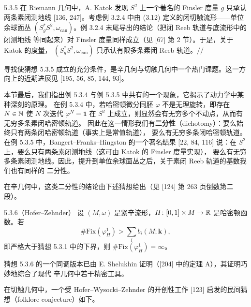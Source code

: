 \begin{wexam}{5.3.5}
  在 Riemann 几何中，A. Katok 发现 $S^2$ 上一个著名的 Finsler 度量 $g$ 只承认两条素闭测地线
  [136, 247]。考虑例 3.2.4 中由 (3.12) 定义的闭切触流形——单位余球面丛
  $(S_g^*S^2,\omega_{\mathrm{can}})$。例 3.2.4 末尾导出的结论（把闭 Reeb 轨道与底流形中的闭测地线
  等同起来）对 Finsler 度量同样成立（见 [67] 第 2 节）。于是，关于 Katok 的度量，
  $(S_g^*S^2,\omega_{\mathrm{can}})$ 只承认有限多条素闭 Reeb 轨道。\hfill$//$
\end{wexam}
寻找使猜想 5.3.5 成立的充分条件，是辛几何与切触几何中一个热门课题。这一方向上的近期进展见
[195, 56, 85, 144, 93]。

本节最后，我们指出例 5.3.4 与例 5.3.5 中共有的一个现象，它揭示了动力学中某种深刻的原理。
在例 5.3.4 中，若哈密顿微分同胚 $\varphi$ 不是无理旋转，即存在 $N\in\mathbb{N}$ 使 $N$ 次迭代
$\varphi^N=\mathbf{1}$ 在 $S^2$ 上成立，则显然会有无穷多个不动点，从而有无穷多条素闭哈密顿轨道。
因此在这一情形我们有\textbf{二分性}（dichotomy）：要么始终只有两条闭哈密顿轨道（事实上是常值轨道），
要么有无穷多条闭哈密顿轨道。在例 5.3.5 中，Bangert--Franks--Hingston 的一个著名结果
[22, 84, 116] 说：在 $S^2$ 上，要么只有两条素闭测地线（这可由 Katok 的 Finsler 度量实现），
要么有无穷多条素闭测地线。因此，提升到单位余球面丛之后，关于素闭 Reeb 轨道的基数我们也有同样的
二分性。

在辛几何中，这类二分性的结论由下述猜想给出（见 [124] 第 263 页倒数第二段）。

\begin{wconj}{5.3.6}（Hofer--Zehnder）
  设 $(M,\omega)$ 是紧辛流形，$H\colon[0,1]\times M\to\mathbb{R}$ 是哈密顿函数。若
  \[
    \#\mathrm{Fix}(\varphi_H^1)>\sum_i b_i(M;\mathbf{k}),
  \]
  即严格大于猜想 5.3.1 中的下界，则 $\#\mathrm{Fix}(\varphi_H^1)=\infty$。
\end{wconj}

猜想 5.3.6 的一个同调版本已由 E. Shelukhin 证明（[204] 中的定理 A），其证明巧妙地综合了现代
辛几何中若干精密工具。

在切触几何中，一个受 Hofer--Wysocki--Zehnder 的开创性工作 [123] 启发的民间猜想（folklore
conjecture）如下。

